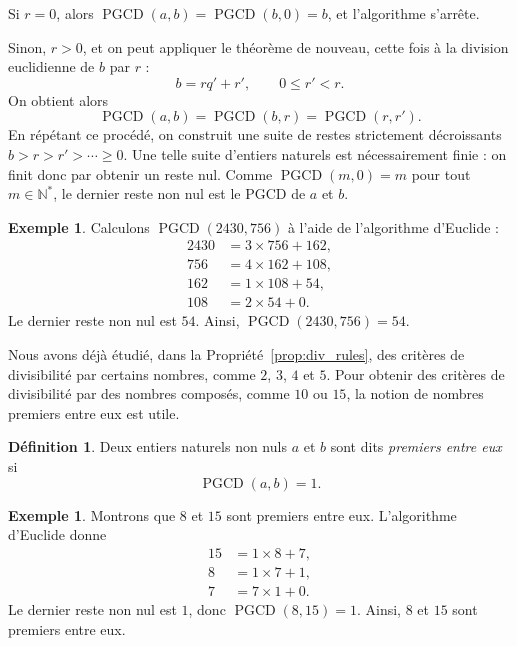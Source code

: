 \documentclass[12pt,a4paper]{article}
\theoremstyle{plain}
\theoremstyle{definition}
\newtheorem{definition}[theorem]{Définition}
\newtheorem{example}[theorem]{Exemple}
\theoremstyle{remark}
\DeclareMathOperator{\pgcd}{PGCD}
\begin{document}
Si $r=0$, alors $\pgcd(a,b)=\pgcd(b,0)=b$, et l'algorithme s'arrête.

Sinon, $r>0$, et on peut appliquer le théorème de nouveau, cette fois à la division euclidienne de $b$ par $r$ :
\[
  b = rq' + r', \qquad 0 \le r' < r.
\]
On obtient alors
\[
  \pgcd(a,b) = \pgcd(b,r) = \pgcd(r,r').
\]
En répétant ce procédé, on construit une suite de restes strictement
décroissants $b > r > r' > \cdots \ge 0$. Une telle suite d'entiers
naturels est nécessairement finie : on finit donc par obtenir un reste nul.
Comme $\pgcd(m,0)=m$ pour tout $m\in\mathbb{N}^*$, le dernier reste non nul
est le PGCD de $a$ et $b$.

\begin{example}
  Calculons $\pgcd(2430,756)$ à l'aide de l'algorithme d'Euclide :
  \[
    \begin{aligned}
      2430&=3\times756+162,\\
      756&=4\times162+108,\\
      162&=1\times108+54,\\
      108&=2\times54+0.
    \end{aligned}
  \]
  Le dernier reste non nul est $54$.
  Ainsi, $\pgcd(2430,756)=54$.
\end{example}

Nous avons déjà étudié, dans la Propriété~\ref{prop:div_rules}, des critères
de divisibilité par certains nombres, comme $2$, $3$, $4$ et $5$. Pour
obtenir des critères de divisibilité par des nombres composés, comme $10$
ou $15$, la notion de nombres premiers entre eux est utile.

\begin{tcolorbox}[navybar]
  \begin{definition}
    Deux entiers naturels non nuls $a$ et $b$ sont dits
    \emph{premiers entre eux} si
    \[
      \pgcd(a,b)=1.
    \]
  \end{definition}
\end{tcolorbox}

\begin{example}
  Montrons que $8$ et $15$ sont premiers entre eux.
  L'algorithme d'Euclide donne
  \[
    \begin{aligned}
      15&=1\times8+7,\\
      8&=1\times7+1,\\
      7&=7\times1+0.
    \end{aligned}
  \]
  Le dernier reste non nul est $1$, donc $\pgcd(8,15)=1$.
  Ainsi, $8$ et $15$ sont premiers entre eux.
\end{example}
\end{document}
